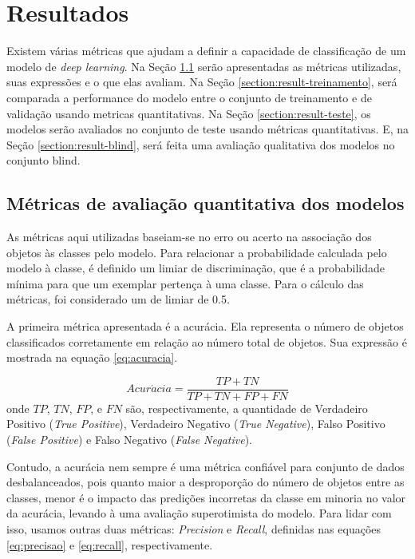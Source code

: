 \section{Resultados}
\label{section:resultados}


Existem várias métricas que ajudam a definir a capacidade de classificação de um modelo de \emph{deep learning}. Na Seção \ref{section:result-metricas} serão apresentadas as métricas utilizadas, suas expressões e o que elas avaliam. Na Seção \ref{section:result-treinamento}, será comparada a performance do modelo entre o conjunto de treinamento e de validação usando metricas quantitativas. Na Seção \ref{section:result-teste}, os modelos serão avaliados no conjunto de teste usando métricas quantitativas. E, na Seção \ref{section:result-blind}, será feita uma avaliação qualitativa dos modelos no conjunto blind.

\subsection{Métricas de avaliação quantitativa dos modelos}
\label{section:result-metricas}

As métricas aqui utilizadas baseiam-se no erro ou acerto na associação dos objetos às classes pelo modelo. Para relacionar a probabilidade calculada pelo modelo à classe, é definido um limiar de discriminação, que é a probabilidade mínima para que um exemplar pertença à uma classe. Para o cálculo das métricas, foi considerado um de limiar de 0.5.

A primeira métrica apresentada é a acurácia. Ela representa o número de objetos classificados corretamente em relação ao número total de objetos. Sua expressão é mostrada na equação \eqref{eq:acuracia}.

\begin{equation}
  \label{eq:acuracia}
  Acur\acute{a}cia = \frac{TP + TN}{TP + TN + FP + FN}
\end{equation}%
onde $TP$, $TN$, $FP$, e $FN$ são, respectivamente, a quantidade de Verdadeiro Positivo (\emph{True Positive}), Verdadeiro Negativo (\emph{True Negative}), Falso Positivo (\emph{False Positive}) e Falso Negativo (\emph{False Negative}).

Contudo, a acurácia nem sempre é uma métrica confiável para conjunto de dados desbalanceados, pois quanto maior a desproporção do número de objetos entre as classes, menor é o impacto das predições incorretas da classe em minoria no valor da acurácia, levando à uma avaliação superotimista do modelo. Para lidar com isso, usamos outras duas métricas: \emph{Precision} e \emph{Recall}, definidas nas equações \eqref{eq:precisao} e \eqref{eq:recall}, respectivamente.

